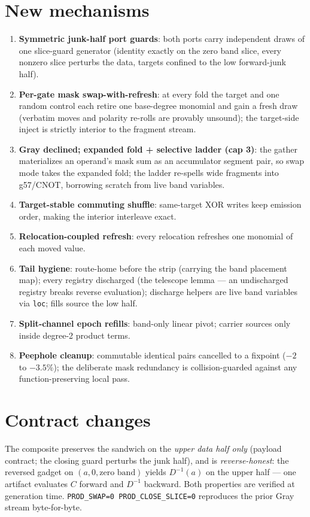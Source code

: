 \documentclass[11pt]{article}
\begin{document}
\section{New mechanisms}
\begin{enumerate}
\item \textbf{Symmetric junk-half port guards}: both ports carry
independent draws of one slice-guard generator (identity exactly on the
zero band slice, every nonzero slice perturbs the data, targets confined
to the low forward-junk half).
\item \textbf{Per-gate mask swap-with-refresh}: at every fold the target
and one random control each retire one base-degree monomial and gain a
fresh draw (verbatim moves and polarity re-rolls are provably unsound);
the target-side inject is strictly interior to the fragment stream.
\item \textbf{Gray declined; expanded fold + selective ladder (cap 3)}:
the gather materializes an operand's mask sum as an accumulator segment
pair, so swap mode takes the expanded fold; the ladder re-spells wide
fragments into g57/CNOT, borrowing scratch from live band variables.
\item \textbf{Target-stable commuting shuffle}: same-target XOR writes
keep emission order, making the interior interleave exact.
\item \textbf{Relocation-coupled refresh}: every relocation refreshes
one monomial of each moved value.
\item \textbf{Tail hygiene}: route-home before the strip (carrying the
band placement map); every registry discharged (the telescope lemma ---
an undischarged registry breaks reverse evaluation); discharge helpers
are live band variables via \texttt{loc}; fills source the low half.
\item \textbf{Split-channel epoch refills}: band-only linear pivot;
carrier sources only inside degree-2 product terms.
\item \textbf{Peephole cleanup}: commutable identical pairs cancelled to
a fixpoint ($-2$ to $-3.5\%$); the deliberate mask redundancy is
collision-guarded against any function-preserving local pass.
\end{enumerate}

\section{Contract changes}
The composite preserves the sandwich on the \emph{upper data half only}
(payload contract; the closing guard perturbs the junk half), and is
\emph{reverse-honest}: the reversed gadget on $(a, 0, \text{zero band})$
yields $D^{-1}(a)$ on the upper half --- one artifact evaluates $C$
forward and $D^{-1}$ backward. Both properties are verified at
generation time. \texttt{PROD\_SWAP=0 PROD\_CLOSE\_SLICE=0} reproduces
the prior Gray stream byte-for-byte.
\end{document}
